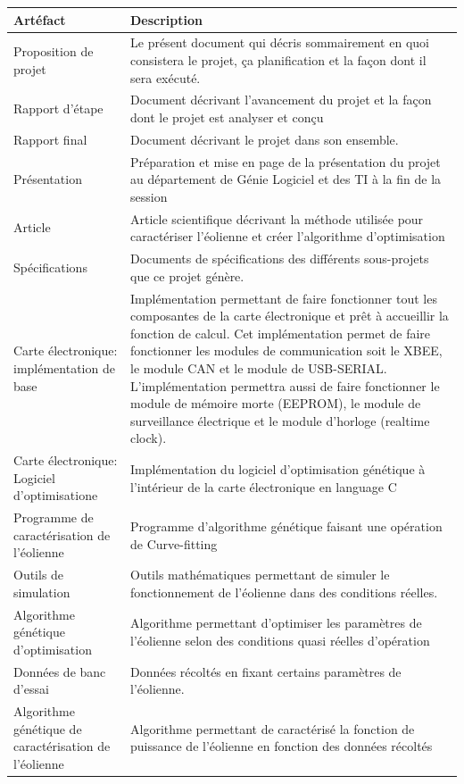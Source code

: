 \documentclass[11pt]{article}
\begin{document}
\begin{longtabu} to \linewidth {X[1,l]X[2,l]}
  \textbf{Artéfact} & \textbf{Description} \\ \hline
  Proposition de projet & Le présent document qui décris sommairement en quoi consistera le projet, ça planification et la façon dont il sera exécuté.\\ \hline
  Rapport d'étape & Document décrivant l'avancement du projet et la façon dont le projet est analyser et conçu \\ \hline
  Rapport final & Document décrivant le projet dans son ensemble.\\ \hline
  Présentation & Préparation et mise en page de la présentation du projet au département de Génie Logiciel et des TI à la fin de la session\\ \hline
  Article & Article scientifique décrivant la méthode utilisée pour caractériser l'éolienne et créer l'algorithme d'optimisation\\ \hline
  Spécifications & Documents de spécifications des différents sous-projets que ce projet génère.\\ \hline
  Carte électronique: implémentation de base & Implémentation permettant de faire fonctionner tout les composantes de la carte électronique et prêt à accueillir la fonction de calcul. Cet implémentation permet de faire fonctionner les modules de communication soit le XBEE, le module CAN et le module de USB-SERIAL. L'implémentation permettra aussi de faire fonctionner le module de mémoire morte (EEPROM), le module de surveillance électrique et le module d'horloge (realtime clock).\\ \hline
  Carte électronique: Logiciel d'optimisatione & Implémentation du logiciel d'optimisation génétique à l'intérieur de la carte électronique en language C\\ \hline
  Programme de caractérisation de l'éolienne & Programme d'algorithme génétique faisant une opération de Curve-fitting \\ \hline
  Outils de simulation & Outils mathématiques permettant de simuler le fonctionnement de l'éolienne dans des conditions réelles. \\ \hline
  Algorithme génétique d'optimisation & Algorithme permettant d'optimiser les paramètres de l'éolienne selon des conditions quasi réelles d'opération \\ \hline
  Données de banc d'essai & Données récoltés en fixant certains paramètres de l'éolienne. \\ \hline
  Algorithme génétique de caractérisation de l'éolienne & Algorithme permettant de caractérisé la fonction de puissance de l'éolienne en fonction des données récoltés \\ \hline 

\end{longtabu}
\end{document}
